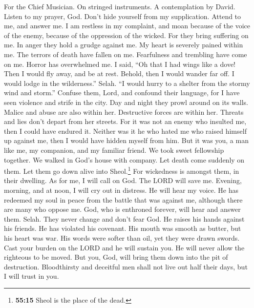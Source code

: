 For the Chief Musician. On stringed instruments. A contemplation by
David.  Listen to my prayer, God. Don't hide yourself from
my supplication.  Attend to me, and answer me. I am
restless in my complaint, and moan  because of the voice
of the enemy, because of the oppression of the wicked. For they bring
suffering on me. In anger they hold a grudge against me. 
My heart is severely pained within me. The terrors of death have fallen
on me.  Fearfulness and trembling have come on me. Horror
has overwhelmed me.  I said, ``Oh that I had wings like a
dove! Then I would fly away, and be at rest.  Behold, then
I would wander far off. I would lodge in the wilderness.'' Selah.
 ``I would hurry to a shelter from the stormy wind and
storm.''  Confuse them, Lord, and confound their language,
for I have seen violence and strife in the city.  Day and
night they prowl around on its walls. Malice and abuse are also within
her.  Destructive forces are within her. Threats and lies
don't depart from her streets.  For it was not an enemy
who insulted me, then I could have endured it. Neither was it he who
hated me who raised himself up against me, then I would have hidden
myself from him.  But it was you, a man like me, my
companion, and my familiar friend.  We took sweet
fellowship together. We walked in God's house with company.
 Let death come suddenly on them. Let them go down alive
into Sheol.\footnote{\textbf{55:15} Sheol is the place of the dead.} For
wickedness is amongst them, in their dwelling.  As for
me, I will call on God. The LORD will save me.  Evening,
morning, and at noon, I will cry out in distress. He will hear my voice.
 He has redeemed my soul in peace from the battle that
was against me, although there are many who oppose me. 
God, who is enthroned forever, will hear and answer them. Selah. They
never change and don't fear God.  He raises his hands
against his friends. He has violated his covenant.  His
mouth was smooth as butter, but his heart was war. His words were softer
than oil, yet they were drawn swords.  Cast your burden
on the LORD and he will sustain you. He will never allow the righteous
to be moved.  But you, God, will bring them down into the
pit of destruction. Bloodthirsty and deceitful men shall not live out
half their days, but I will trust in you.

